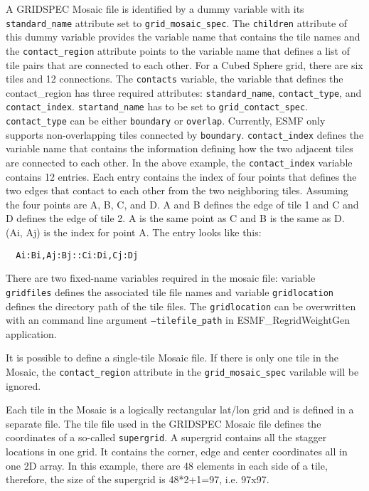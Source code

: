 A GRIDSPEC Mosaic file is identified by a dummy variable with its {\tt standard\_name} attribute set to {\tt grid\_mosaic\_spec}.
The {\tt children} attribute of this dummy variable provides the variable name that contains the tile names and the 
{\tt contact\_region} attribute points to the variable name that defines a list of tile pairs that are connected
to each other.  For a Cubed Sphere grid, there are six tiles and 12 connections.  The {\tt contacts} variable, the 
variable that defines the contact\_region
has three required attributes: {\tt standard\_name}, {\tt contact\_type}, and {\tt contact\_index}.  {\tt startand\_name}
has to be set to {\tt grid\_contact\_spec}.  {\tt contact\_type} can be either {\tt boundary} or {\tt overlap}. Currently, ESMF
only supports non-overlapping tiles connected by {\tt boundary}. {\tt contact\_index} defines the variable name that contains the information defining how the
two adjacent tiles are connected to each other.  In the above example, the {\tt contact\_index} variable contains 12 entries.  Each entry
contains the index of four points that defines the two edges that contact to 
 each other from the two neighboring tiles.  Assuming the four points are A, B, C, and D.  
 A and B defines the edge of tile 1 and C and D defines the edge of tile 2.  A is the same point
 as C and B is the same as D.  (Ai, Aj) is the index for point A. The entry looks like this:
\begin{verbatim}
  Ai:Bi,Aj:Bj::Ci:Di,Cj:Dj
\end{verbatim}

There are two fixed-name variables required in the mosaic file: variable {\tt gridfiles} defines the associated tile file names and 
variable {\tt gridlocation} defines the directory path of the tile files.
The {\tt gridlocation} can be overwritten with an command line argument {\tt --tilefile\_path} in ESMF\_RegridWeightGen application.  

It is possible to define a single-tile Mosaic file.  If there is only one tile in the Mosaic, the {\tt contact\_region} attribute in the
{\tt grid\_mosaic\_spec} varilable will be ignored.

Each tile in the Mosaic is a logically rectangular lat/lon grid and is defined in a separate file.   The tile file used in the GRIDSPEC Mosaic file defines the coordinates of a so-called 
{\tt supergrid}.  A supergrid contains all the
stagger locations in one grid.  It contains the corner, edge and center coordinates all in one 2D array.
In this example, there are 48 elements in each side of a tile, therefore, the size of the supergrid is 
48*2+1=97, i.e. 97x97.

